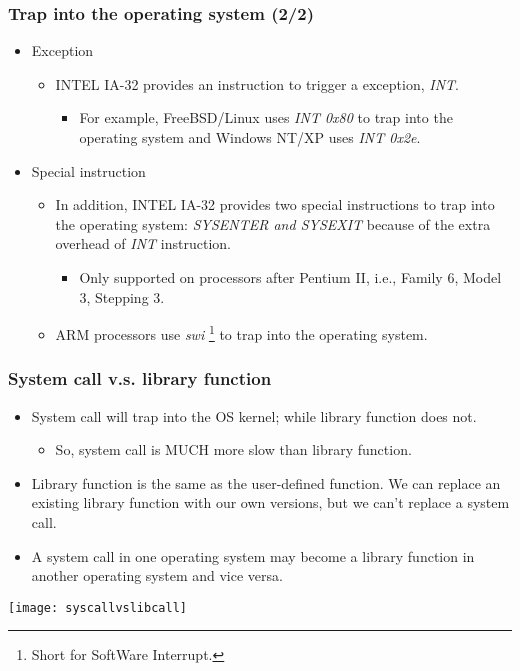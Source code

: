\documentclass[CJKutf8,xcolor=pdftex,dvipsnames,table]{beamer}
\begin{document}
\begin{CJK*}{UTF8}{song}
  \begin{frame}
    \frametitle{Trap into the operating system (2/2)} \pause
    \begin{itemize}
    \item{Exception} \pause
      \begin{itemize}
      \item{INTEL IA-32 provides an instruction to trigger a exception, \emph{INT}.} \pause
        \begin{itemize}
        \item{For example, FreeBSD/Linux uses \emph{INT 0x80} to trap into the operating system and Windows NT/XP uses \emph{INT 0x2e}.} \pause
        \end{itemize}
      \end{itemize}
    \item{Special instruction} \pause
      \begin{itemize}
      \item{In addition, INTEL IA-32 provides two special instructions to trap into the operating system: \emph{SYSENTER and SYSEXIT} because of the extra overhead of \emph{INT} instruction.} \pause
        \begin{itemize}
        \item{Only supported on processors after Pentium II, i.e., Family 6, Model 3, Stepping 3.} \pause
        \end{itemize}
      \item{ARM processors use \emph{swi} \footnote{Short for SoftWare
        Interrupt.} to trap into the operating system.}
      \end{itemize}
    \end{itemize}
  \end{frame}

  \begin{frame}
    \frametitle{System call v.s. library function} \pause
    \begin{itemize}
    \item{System call will trap into the OS kernel; while library function does not.} \pause
      \begin{itemize}
      \item{So, system call is MUCH more slow than library function.} \pause
      \end{itemize}
    \item{Library function is the same as the user-defined function. We can replace an existing library function with our own versions, but we can't replace a system call.} \pause
    \item{A system call in one operating system may become a library function in another operating system and vice versa.} \pause
    \end{itemize}
    \begin{center}
      \texttt{[image: syscallvslibcall]}
    \end{center}
  \end{frame}


\end{CJK*}
\end{document}
